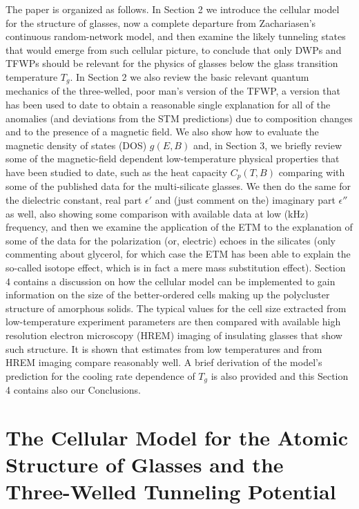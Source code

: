 \documentclass[10pt]{article}
\begin{document}
The paper is organized as follows. In Section 2 we introduce the cellular 
model for the structure of glasses, now a complete departure from Zachariasen's
continuous random-network model, and then examine the likely tunneling states 
that would emerge from such cellular picture, to conclude that only DWPs and 
TFWPs should be relevant for the physics of glasses below the glass transition 
temperature $T_g$. In Section 2 we also review the basic relevant quantum 
mechanics of the three-welled, poor man's version of the TFWP, a version that 
has been used to date to obtain a reasonable single explanation for all of the 
anomalies (and deviations from the STM predictions) due to composition changes 
and to the presence of a magnetic field. We also show how to evaluate the 
magnetic density of states (DOS) $g(E,B)$ and, in Section 3, we briefly review some 
of the magnetic-field dependent low-temperature physical properties that have 
been studied to date, such as the heat capacity $C_p(T,B)$ comparing with some 
of the published data for the multi-silicate glasses.  We then do the same for the 
dielectric constant, real part $\epsilon'$ and (just comment on the) imaginary part 
$\epsilon''$ as well, also showing some comparison with available data at low 
(kHz) frequency, and then we examine the application of the ETM to the explanation 
of some of the data for the polarization (or, electric) echoes in the silicates (only 
commenting about glycerol, for which case the ETM has been able to explain the 
so-called isotope effect, which is in fact a mere mass substitution effect). 
Section 4 contains a discussion on how the cellular model can be  implemented 
to gain information on the size of the better-ordered cells making up the polycluster
structure of amorphous solids. The typical values for the cell size extracted from
low-temperature experiment parameters are then compared with available high 
resolution electron microscopy (HREM) imaging of insulating glasses that show 
such structure. It is shown that estimates from low temperatures and from HREM 
imaging compare reasonably well. A brief derivation of the
model's prediction for the cooling rate dependence of $T_g$ is also provided and 
this Section 4 contains also our Conclusions.  


\section{The Cellular Model for the Atomic Structure of Glasses and the 
Three-Welled Tunneling Potential}
\end{document}
